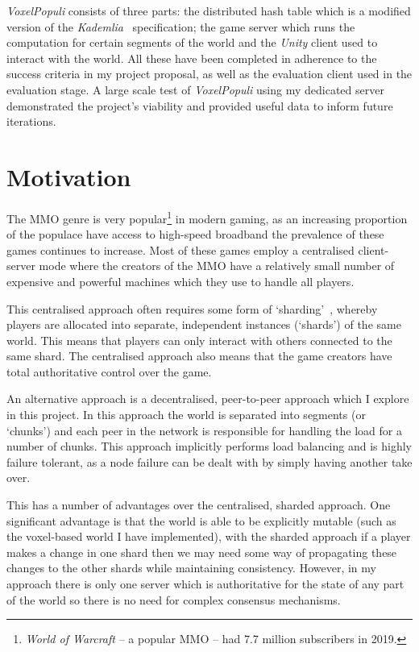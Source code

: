 \documentclass[12pt,notitlepage,a4paper]{report}
\newcommand{\unity}{\emph{Unity}}
\newcommand{\kademlia}{\emph{Kademlia}}
\newcommand{\voxpop}{\emph{VoxelPopuli}}
\begin{document}
	\voxpop{} consists of three parts: the distributed hash table which is a modified version of the \kademlia{}~\cite{kademlia} specification; the game server which runs the computation for certain segments of the world and the \unity{} client used to interact with the world. All these have been completed in adherence to the success criteria in my project proposal, as well as the evaluation client used in the evaluation stage. A large scale test of \voxpop{} using my dedicated server demonstrated the project's viability and provided useful data to inform future iterations.
	
	\section{Motivation}
	The MMO genre is very popular\footnote{\emph{World of Warcraft} -- a popular MMO -- had 7.7 million subscribers in 2019.} in modern gaming, as an increasing proportion of the populace have access to high-speed broadband the prevalence of these games continues to increase. Most of these games employ a centralised client-server mode where the creators of the MMO have a relatively small number of expensive and powerful machines which they use to handle all players.
	
	This centralised approach often requires some form of `sharding'~\cite{shard}, whereby players are allocated into separate, independent instances (`shards') of the same world. This means that players can only interact with others connected to the same shard. The centralised approach also means that the game creators have total authoritative control over the game.
	
	An alternative approach is a decentralised, peer-to-peer approach which I explore in this project. In this approach the world is separated into segments (or `chunks') and each peer in the network is responsible for handling the load for a number of chunks. This approach implicitly performs load balancing and is highly failure tolerant, as a node failure can be dealt with by simply having another take over.
	
	This has a number of advantages over the centralised, sharded approach. One significant advantage is that the world is able to be explicitly mutable (such as the voxel-based world I have implemented), with the sharded approach if a player makes a change in one shard then we may need some way of propagating these changes to the other shards while maintaining consistency. However, in my approach there is only one server which is authoritative for the state of any part of the world so there is no need for complex consensus mechanisms.
	
\end{document}
